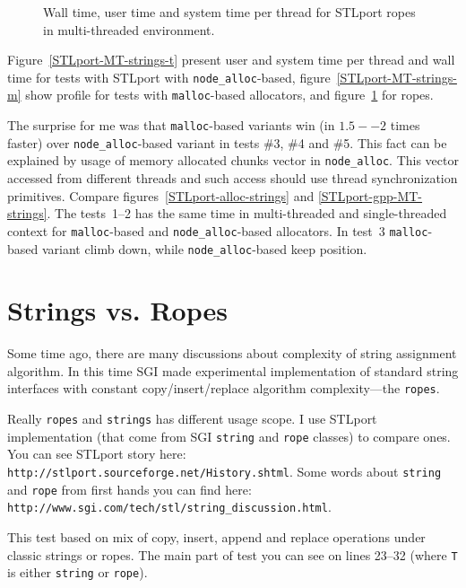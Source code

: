 \documentclass[a4paper]{article}
\providecommand{\STLport}{{\fontfamily{cmss}\selectfont STLport}}
\begin{document}
\begin{figure}
  \begin{center}
    
  \end{center}
  \caption{
           Wall time, user time and system time per thread for 
           \STLport{} ropes in multi-threaded environment.
           \label{STLport-MT-strings-r}}
\end{figure}

Figure~\ref{STLport-MT-strings-t} present user and system time per thread
and wall time for tests with STLport with
\texttt{node\_alloc}-based,
figure~\ref{STLport-MT-strings-m} show profile for tests with \texttt{malloc}-based allocators, and figure~\ref{STLport-MT-strings-r} for ropes.

The surprise for me was that \texttt{malloc}-based variants
win (in $1.5--2$ times faster) over \texttt{node\_alloc}-based variant in tests \#3,
\#4 and \#5.
This fact can be explained by usage of memory allocated chunks vector
in \texttt{node\_alloc}. This vector accessed from different threads
and such access should use thread synchronization primitives.
Compare figures~\ref{STLport-alloc-strings} and \ref{STLport-gpp-MT-strings}.
The tests~1--2 has the same time in multi-threaded and single-threaded context for
\texttt{malloc}-based and \texttt{node\_alloc}-based allocators.
In test~3 \texttt{malloc}-based variant climb down, while
\texttt{node\_alloc}-based keep position. 

\section{Strings vs. Ropes}

Some time ago, there are many discussions about complexity
of string assignment algorithm.
In this time 
SGI made experimental implementation of standard string interfaces
with constant copy/insert/replace algorithm complexity---the \texttt{ropes}.

Really \texttt{ropes} and \texttt{strings} has different usage scope.
I use STLport implementation (that come from SGI \texttt{string} and \texttt{rope}
classes) to compare ones. You can see STLport story here:
\texttt{http://stlport.sourceforge.net/History.shtml}.
Some words about \texttt{string} and \texttt{rope}
from first hands you can find here:\\
\texttt{http://www.sgi.com/tech/stl/string\_discussion.html}.

This test based on mix of copy, insert, append and replace
operations under classic strings or ropes. The main part
of test you can see on lines 23--32 (where \texttt{T} is
either \texttt{string} or \texttt{rope}).
\end{document}
